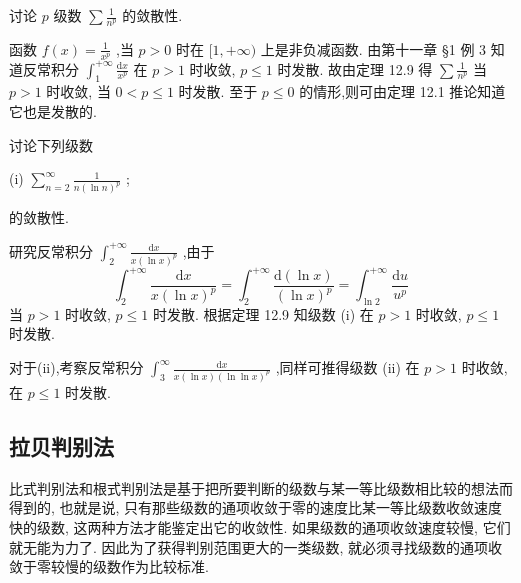 \begin{example}

\end{example}
讨论 \(p\) 级数 \(\sum \frac{1}{{n}^{p}}\) 的敛散性.

\begin{solution}

\end{solution}
函数 \(f\left( x\right)  = \frac{1}{{x}^{p}}\) ,当 \(p > 0\) 时在 \(\lbrack 1, + \infty )\) 上是非负减函数. 由第十一章 §1 例 3 知道反常积分 \({\int }_{1}^{+\infty }\frac{\mathrm{d}x}{{x}^{p}}\) 在 \(p > 1\) 时收敛, \(p \leq  1\) 时发散. 故由定理 12.9 得 \(\sum \frac{1}{{n}^{p}}\) 当 \(p > 1\) 时收敛, 当 \(0 < p \leq  1\) 时发散. 至于 \(p \leq  0\) 的情形,则可由定理 12.1 推论知道它也是发散的.

\begin{example}

\end{example}
讨论下列级数

(i) \(\mathop{\sum }\limits_{{n = 2}}^{\infty }\frac{1}{n{\left( \ln n\right) }^{p}}\) ;

的敛散性.

\begin{solution}

\end{solution}
研究反常积分 \({\int }_{2}^{+\infty }\frac{\mathrm{d}x}{x{\left( \ln x\right) }^{p}}\) ,由于
\[
{\int }_{2}^{+\infty }\frac{\mathrm{d}x}{x{\left( \ln x\right) }^{p}} = {\int }_{2}^{+\infty }\frac{\mathrm{d}\left( {\ln x}\right) }{{\left( \ln x\right) }^{p}} = {\int }_{\ln 2}^{+\infty }\frac{\mathrm{d}u}{{u}^{p}}
\]
当 \(p > 1\) 时收敛, \(p \leq  1\) 时发散. 根据定理 12.9 知级数 (i) 在 \(p > 1\) 时收敛, \(p \leq  1\) 时发散.

对于(ii),考察反常积分 \({\int }_{3}^{\infty }\frac{\mathrm{d}x}{x\left( {\ln x}\right) {\left( \ln \ln x\right) }^{p}}\) ,同样可推得级数 (ii) 在 \(p > 1\) 时收敛,在 \(p \leq  1\) 时发散.

\subsection{拉贝判别法}

比式判别法和根式判别法是基于把所要判断的级数与某一等比级数相比较的想法而得到的, 也就是说, 只有那些级数的通项收敛于零的速度比某一等比级数收敛速度快的级数, 这两种方法才能鉴定出它的收敛性. 如果级数的通项收敛速度较慢, 它们就无能为力了. 因此为了获得判别范围更大的一类级数, 就必须寻找级数的通项收敛于零较慢的级数作为比较标准.

